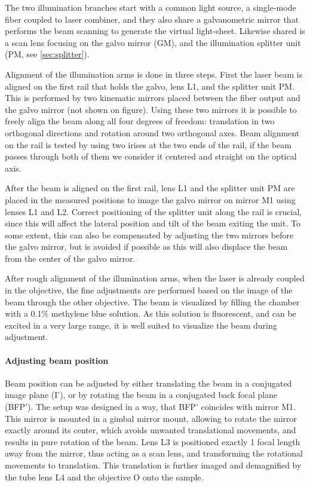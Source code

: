     The two illumination branches start with a common light source, a single-mode fiber coupled to laser combiner, and they also share a galvanometric mirror that performs the beam scanning to generate the virtual light-sheet. Likewise shared is a scan lens focusing on the galvo mirror (GM), and the illumination splitter unit (PM, see \autoref{sec:splitter}).

    Alignment of the illumination arms is done in three steps. First the laser beam is aligned on the first rail that holds the galvo, lens L1, and the splitter unit PM. This is performed by two kinematic mirrors placed between the fiber output and the galvo mirror (not shown on figure). Using these two mirrors it is possible to freely align the beam along all four degrees of freedom: translation in two orthogonal directions and rotation around two orthogonal axes. Beam alignment on the rail is tested by using two irises at the two ends of the rail, if the beam passes through both of them we consider it centered and straight on the optical axis.

    After the beam is aligned on the first rail, lens L1 and the splitter unit PM are placed in the measured positions to image the galvo mirror on mirror M1 using lenses L1 and L2. Correct positioning of the splitter unit along the rail is crucial, since this will affect the lateral position and tilt of the beam exiting the unit. To some extent, this can also be compensated by adjusting the two mirrors before the galvo mirror, but is avoided if possible as this will also displace the beam from the center of the galvo mirror.

    After rough alignment of the illumination arms, when the laser is already coupled in the objective, the fine adjustments are performed based on the image of the beam through the other objective. The beam is visualized by filling the chamber with a 0.1\% methylene blue solution. As this solution is fluorescent, and can be excited in a very large range, it is well suited to visualize the beam during adjustment.

    \paragraph{Adjusting beam position}
      Beam position can be adjusted by either translating the beam in a conjugated image plane (I'), or by rotating the beam in a conjugated back focal plane (BFP'). The setup was designed in a way, that BFP' coincides with mirror M1. This mirror is mounted in a gimbal mirror mount, allowing to rotate the mirror exactly around its center, which avoids unwanted translational movements, and results in pure rotation of the beam. Lens L3 is positioned exactly 1 focal length away from the mirror, thus acting as a scan lens, and transforming the rotational movements to translation. This translation is further imaged and demagnified by the tube lens L4 and the objective O onto the sample.


